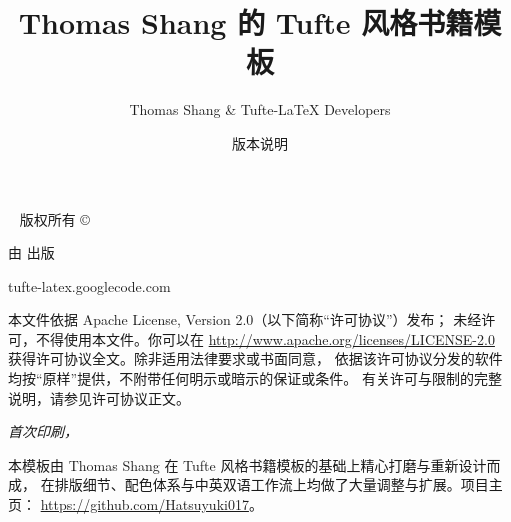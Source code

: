 \documentclass[nofonts,nohyper,nobib]{tufte-book}
\title{Thomas Shang 的 Tufte 风格书籍模板}
\date{版本说明}
\author[Thomas Shang \& Tufte-LaTeX Developers]{Thomas Shang \& Tufte-LaTeX Developers}
\begin{document}
\frontmatter




\maketitle


\newpage
\begin{fullwidth}
~\vfill
\thispagestyle{empty}
\setlength{\parindent}{0pt}
\setlength{\parskip}{\baselineskip}
版权所有 \copyright\ \the\year\ \thanklessauthor

\par 由 \thanklesspublisher 出版

\par tufte-latex.googlecode.com

\par 本文件依据 Apache License, Version 2.0（以下简称“许可协议”）发布；
未经许可，不得使用本文件。你可以在
\url{http://www.apache.org/licenses/LICENSE-2.0}
获得许可协议全文。除非适用法律要求或书面同意，
依据该许可协议分发的软件均按“原样”提供，不附带任何明示或暗示的保证或条件。
有关许可与限制的完整说明，请参见许可协议正文。

\par\textit{首次印刷，\monthyear}

\par\medskip
本模板由 Thomas Shang 在 Tufte 风格书籍模板的基础上精心打磨与重新设计而成，
在排版细节、配色体系与中英双语工作流上均做了大量调整与扩展。项目主页：
\url{https://github.com/Hatsuyuki017}。
\end{fullwidth}

\tableofcontents


\listoffigures
\end{document}
